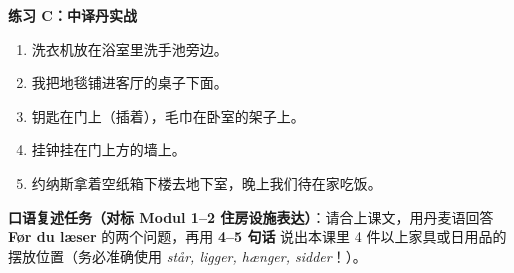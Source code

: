 \textbf{练习 C：中译丹实战}
\begin{enumerate}
  \item 洗衣机放在浴室里洗手池旁边。
  \item 我把地毯铺进客厅的桌子下面。
  \item 钥匙在门上（插着），毛巾在卧室的架子上。
  \item 挂钟挂在门上方的墙上。
  \item 约纳斯拿着空纸箱下楼去地下室，晚上我们待在家吃饭。
\end{enumerate}


\textbf{口语复述任务（对标 Modul 1--2 住房设施表达）}：请合上课文，用丹麦语回答 \textbf{Før du læser} 的两个问题，再用 \textbf{4--5 句话} 说出本课里 4 件以上家具或日用品的摆放位置（务必准确使用 \textit{står, ligger, hænger, sidder}！）。

